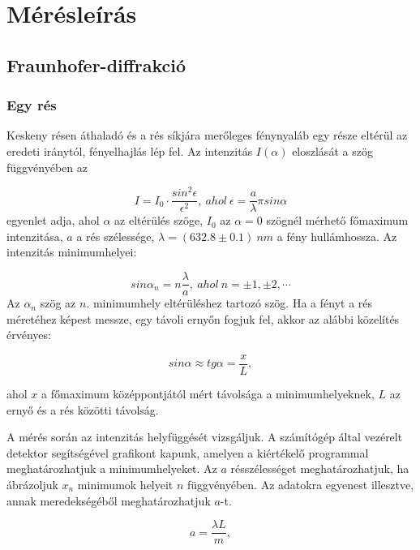 \documentclass[a4paper,11pt]{article}
\begin{document}
\section{Mérésleírás}

\subsection{Fraunhofer-diffrakció}

\subsubsection{Egy rés}

\indent Keskeny résen áthaladó és a rés síkjára merőleges fénynyaláb egy része eltérül az eredeti iránytól, fényelhajlás lép fel. Az intenzitás $I(\alpha)$ eloszlását a szög függvényében az

\begin{equation}
I=I_0\cdot \frac{sin^2\epsilon}{\epsilon^2},~ahol~ \epsilon=\frac{a}{\lambda} \pi sin \alpha
\end{equation}
egyenlet adja, ahol $\alpha$ az eltérülés szöge, $I_0$ az $\alpha = 0$ szögnél mérhető főmaximum intenzitása, $a$ a rés szélessége, $\lambda=(632.8\pm0.1)~nm$ a fény hullámhossza. Az intenzitás minimumhelyei:

\begin{equation}
sin \alpha_n=n\frac{\lambda}{a},~ahol~n=\pm1,\pm2, \cdots
\end{equation}
Az $\alpha_n$ szög az $n.$ minimumhely eltérüléshez tartozó szög. Ha a fényt a rés méretéhez képest messze, egy távoli ernyőn fogjuk fel, akkor az alábbi közelítés érvényes:

\begin{equation}
sin \alpha \approx tg \alpha=\frac{x}{L},
\end{equation}

ahol $x$ a főmaximum középpontjától mért távolsága a minimumhelyeknek, $L$ az ernyő és a rés közötti távolság. 

A mérés során az intenzitás helyfüggését vizsgáljuk. A számítógép által vezérelt detektor segítségével grafikont kapunk, amelyen a kiértékelő programmal  meghatározhatjuk a minimumhelyeket. Az $a$ résszélességet meghatározhatjuk, ha ábrázoljuk $x_n$ minimumok helyeit $n$ függvényében. Az adatokra egyenest illesztve, annak meredekségéből meghatározhatjuk $a$-t.

\begin{equation}
a=\frac{\lambda L}{m} ,
\end{equation}
\end{document}
